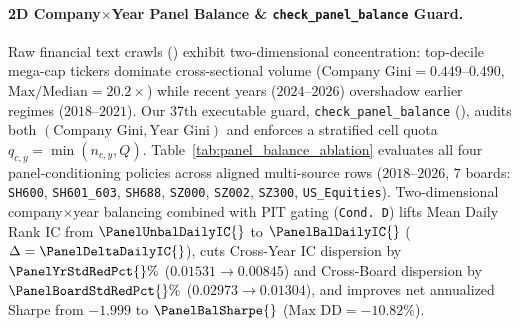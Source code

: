\paragraph{2D Company$\times$Year Panel Balance \& \texttt{check\_panel\_balance} Guard.}
Raw financial text crawls () exhibit two-dimensional concentration: top-decile mega-cap tickers dominate cross-sectional volume ($\text{Company Gini} = 0.449\text{--}0.490$, $\text{Max/Median} = 20.2\times$) while recent years ($2024\text{--}2026$) overshadow earlier regimes ($2018\text{--}2021$). Our 37th executable guard, \texttt{check\_panel\_balance} (), audits both $(\text{Company Gini}, \text{Year Gini})$ and enforces a stratified cell quota $q_{c,y} = \min(n_{c,y}, Q)$. Table~\ref{tab:panel_balance_ablation} evaluates all four panel-conditioning policies across \PanelBalancedRows{} aligned multi-source rows ($2018\text{--}2026$, $7$ boards: \texttt{SH600}, \texttt{SH601\_603}, \texttt{SH688}, \texttt{SZ000}, \texttt{SZ002}, \texttt{SZ300}, \texttt{US\_Equities}). Two-dimensional company$\times$year balancing combined with PIT gating (\texttt{Cond.\ D}) lifts Mean Daily Rank IC from $\PanelUnbalDailyIC{}$ to $\mathbf{\PanelBalDailyIC{}}$ ($\Delta = \mathbf{\PanelDeltaDailyIC{}}$), cuts Cross-Year IC dispersion by $\mathbf{\PanelYrStdRedPct{}\%}$ ($0.01531 \to 0.00845$) and Cross-Board dispersion by $\mathbf{\PanelBoardStdRedPct{}\%}$ ($0.02973 \to 0.01304$), and improves net annualized Sharpe from $-1.999$ to $\mathbf{\PanelBalSharpe{}}$ ($\text{Max DD} = -10.82\%$).

\vspace{-0.12cm}
\begin{table}[!h]
\centering
{}
\vspace{-0.14cm}
\caption{2D Company$\times$Year panel balance ablation across $2018\text{--}2026$ and $7$ market boards.}
\label{tab:panel_balance_ablation}
\vspace{-0.16cm}
\end{table}

